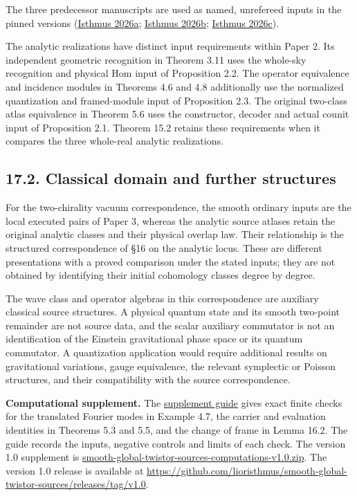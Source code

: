 \documentclass[
  english,
  11pt,
  reqno]{amsart}
\makeatletter
\newcommand{\paperleadspace}{%
  \par\if@nobreak\else
    \addpenalty{\@secpenalty}\addvspace{.5\baselineskip}%
  \fi}
\newcommand{\paperleadin}[1]{%
  \ifvmode\paperleadspace\fi
  \textbf{#1}}
\makeatother
\begin{document}
The three predecessor manuscripts are used as named, unrefereed inputs
in the pinned versions (\hyperref[ref-IsthmusProjective2026]{Isthmus
2026a}; \hyperref[ref-IsthmusGlobal2026]{Isthmus 2026b};
\hyperref[ref-IsthmusSmooth2026]{Isthmus 2026c}).

The analytic realizations have distinct input requirements within Paper
2. Its independent geometric recognition in Theorem 3.11 uses the
whole-sky recognition and physical Hom input of Proposition 2.2. The
operator equivalence and incidence modules in Theorems 4.6 and 4.8
additionally use the normalized quantization and framed-module input of
Proposition 2.3. The original two-class atlas equivalence in Theorem 5.6
uses the constructor, decoder and actual counit input of Proposition
2.1. Theorem 15.2 retains these requirements when it compares the three
whole-real analytic realizations.

\protect{}\label{sec:classical-domain-and-further-structures}

\subsection{17.2. Classical domain and further
structures}\label{classical-domain-and-further-structures}

For the two-chirality vacuum correspondence, the smooth ordinary inputs
are the local executed pairs of Paper 3, whereas the analytic source
atlases retain the original analytic classes and their physical overlap
law. Their relationship is the structured correspondence of §16 on the
analytic locus. These are different presentations with a proved
comparison under the stated inputs; they are not obtained by identifying
their initial cohomology classes degree by degree.

The wave class and operator algebras in this correspondence are
auxiliary classical source structures. A physical quantum state and its
smooth two-point remainder are not source data, and the scalar auxiliary
commutator is not an identification of the Einstein gravitational phase
space or its quantum commutator. A quantization application would
require additional results on gravitational variations, gauge
equivalence, the relevant symplectic or Poisson structures, and their
compatibility with the source correspondence.

\paperleadin{Computational supplement.} The
\href{../computations/README.md}{supplement guide} gives exact finite
checks for the translated Fourier modes in Example 4.7, the carrier and
evaluation identities in Theorems 5.3 and 5.5, and the change of frame
in Lemma 16.2. The guide records the inputs, negative controls and
limits of each check. The version 1.0 supplement is
\href{https://github.com/lioristhmus/smooth-global-twistor-sources/releases/download/v1.0/smooth-global-twistor-sources-computations-v1.0.zip}{smooth-global-twistor-sources-computations-v1.0.zip}.
The version 1.0 release is available at
\url{https://github.com/lioristhmus/smooth-global-twistor-sources/releases/tag/v1.0}.
\end{document}
